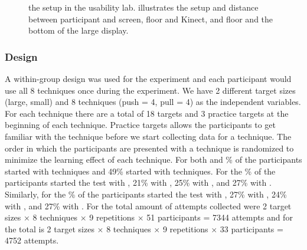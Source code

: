 \begin{figure}[H]
\caption{\protect{} the setup in the usability lab. \protect{} illustrates the setup and distance between participant and screen, floor and Kinect, and floor and the bottom of the large display.}
\end{figure}

\subsubsection{Design} \label{}
A within-group design was used for the experiment and each participant would use all 8 techniques once during the experiment.
We have 2 different target sizes (large, small) and 8 techniques (push = 4, pull = 4) as the independent variables.
For each technique there are a total of 18 targets and 3 practice targets at the beginning of each technique. 
Practice targets allows the participants to get familiar with the technique before we start collecting data for a technique.
The order in which the participants are presented with a technique is randomized to minimize the learning effect of each technique.
For both \target and \% of the participants started with \push techniques and 49\% started with \pull techniques.
For the \% of the participants started the test with \grab, 21\% with \swipe, 25\% with \throw, and 27\% with \tilt.
Similarly, for the \% of the participants started the test with \grab, 27\% with \swipe, 24\% with \throw, and 27\% with \tilt.
For \target the total amount of attempts collected were 2 target sizes $\times$ 8 techniques $\times$ 9 repetitions $\times$ 51 participants = 7344 attempts and for \accuracy the total is 2 target sizes $\times$ 8 techniques $\times$ 9 repetitions $\times$ 33 participants = 4752 attempts.

